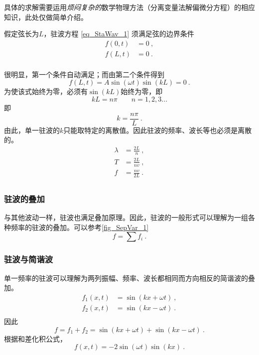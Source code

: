 具体的求解需要运用\textsl{烦闷复杂的}数学物理方法（分离变量法解偏微分方程）的相应知识，此处仅做简单介绍。

假定弦长为$L$，驻波方程 \autoref{eq_StaWav_1} 须满足弦的边界条件 
$$
\begin{aligned}
f(0,t)&=0~,\\
f(L,t)&=0~.\\
\end{aligned}
$$

很明显，第一个条件自动满足；而由第二个条件得到
$$
f(L,t)=A\sin(\omega t)\sin(kL)=0~.
$$
为使该式始终为零，必须有$\sin(kL)$始终为零，即
$$kL = n\pi \qquad n=1,2,3...$$
即
\begin{equation}
k=\frac{n\pi}{L}~.
\end{equation}
由此，单一驻波的$k$只能取特定的离散值。因此驻波的频率、波长等也必须是离散的。
\begin{equation}
\begin{aligned}
\lambda &=\frac{2L}{n}~,\\
T &=\frac{2L}{nv}~,\\
f &=\frac{nv}{2L}~.\\
\end{aligned}
\end{equation}
\subsubsection{驻波的叠加}
与其他波动一样，驻波也满足叠加原理。因此，驻波的一般形式可以理解为一组各种频率的驻波的叠加。可以参考\autoref{fig_SepVar_1}~
$$f=\sum f_i~.$$

\subsubsection{驻波与简谐波}
单一频率的驻波可以理解为两列振幅、频率、波长都相同而方向相反的简谐波的叠加。
$$
\begin{aligned}
f_1(x,t)&=\sin(kx+\omega t)~,\\
f_2(x,t)&=\sin(kx-\omega t)~.\\
\end{aligned}
$$
因此
$$f=f_1+f_2=\sin(kx+\omega t)+\sin(kx-\omega t)~.$$
根据和差化积公式，
\begin{equation}
f(x,t)=-2\sin(\omega t)\sin(kx)~.
\end{equation}

